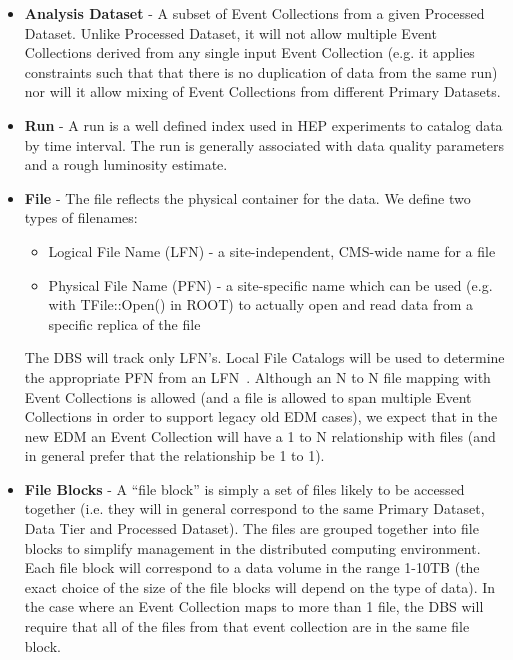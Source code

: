 \documentclass[pdftex]{cmspaper}
\begin{document}
\begin{itemize}
\item {\bf Analysis Dataset} - A subset of Event Collections from a given 
Processed Dataset. Unlike Processed Dataset, it will not allow multiple Event 
Collections derived from any single input Event Collection (e.g. it applies
constraints such that that there is no duplication of data from the same 
run) nor will it allow mixing of Event Collections from different Primary 
Datasets.

\item {\bf Run} - A run is a well defined index used in HEP experiments to 
catalog data by time interval. The run is generally associated with data
quality parameters and a rough luminosity estimate.

\item {\bf File} - The file reflects the physical container for the data. We 
define two types of filenames:
    \begin{itemize}
    \item Logical File Name (LFN) - a site-independent, CMS-wide name for
          a file
    \item Physical File Name (PFN) - a site-specific name which can be used
          (e.g. with TFile::Open() in ROOT) to actually open and read data
          from a specific replica of the file
    \end{itemize}
The DBS will track only LFN's. Local File Catalogs will be used to determine
the appropriate PFN from an LFN~\cite{CTDR}.
Although an N to N file mapping with Event Collections is allowed (and a file 
is allowed to span multiple Event Collections in order to support legacy old
EDM cases), we expect that in the new EDM an Event Collection will have a 1 to
N relationship with files (and in general prefer that the relationship be
1 to 1). 

\item {\bf File Blocks} - A ``file block'' is simply a set of files
likely to be accessed together (i.e. they will in general correspond to
the same Primary Dataset, Data Tier and Processed Dataset). The files are 
grouped together into file blocks to simplify management in the distributed 
computing environment. Each file block will correspond to a data volume in 
the range 1-10TB (the exact choice of the size of the file blocks will depend 
on the type of data). In the case where an Event Collection maps to more than
1 file, the DBS will require that all of the files from that event collection
are in the same file block.

\end{itemize} 
\end{document}
